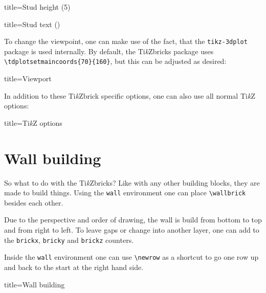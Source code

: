 \documentclass[parskip=half]{scrartcl}
\newcommand{\tikzbrick}{Ti\emph{k}Zbrick\xspace}
\begin{document}
\begin{tcblisting}{title={Stud height (5)}}
\end{tcblisting}
\begin{tcblisting}{title={Stud text ()}}
\end{tcblisting}

To change the viewpoint, one can make use of the fact, that the \texttt{tikz-3dplot} package is used internally. By default, the \tikzbrick{}s package uses \lstinline|\tdplotsetmaincoords{70}{160}|, but this can be adjusted as desired:
\begin{tcblisting}{title={Viewport}}
\end{tcblisting}

In addition to these \tikzbrick specific options, one can also use all normal Ti\emph{k}Z options:
\begin{tcblisting}{title={Ti\emph{k}Z options}}
\end{tcblisting}

\section{Wall building}

So what to do with the \tikzbrick{}s? Like with any other building blocks, they are made to build things. Using the \lstinline|wall| environment one can place \lstinline|\wallbrick| besides each other. 

Due to the perspective and order of drawing, the wall is build from bottom to top and from right to left. To leave gaps or change into another layer, one can add to the \lstinline|brickx|, \lstinline|bricky| and \lstinline|brickz| counters. 

Inside the \lstinline|wall| environment one can use \lstinline|\newrow| as a shortcut to go one row up and back to the start at the right hand side. 
\begin{tcblisting}{title={Wall building}}
\begin{wall}
  \addtocounter{brickx}{1}
  \newrow
\end{wall}
\end{tcblisting}
\end{document}
